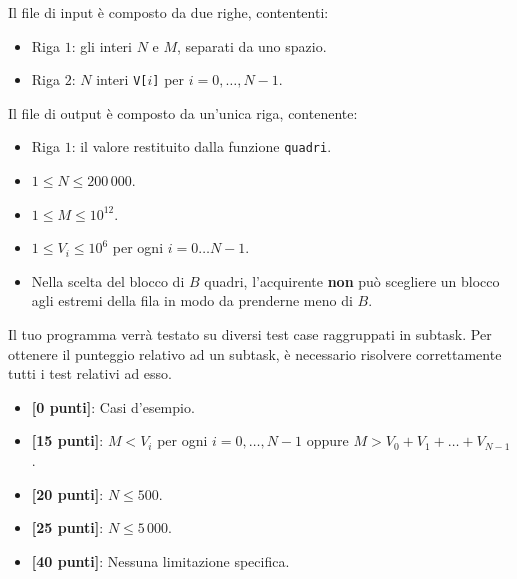 Il file di input è composto da due righe, contententi:

\begin{itemize}[nolistsep,itemsep=2mm]
    \item Riga $1$: gli interi $N$ e $M$, separati da uno spazio.
    \item Riga $2$: $N$ interi \texttt{V[$i$]} per $i = 0,\ldots, N-1$.
\end{itemize}

Il file di output è composto da un'unica riga, contenente:
\begin{itemize}[nolistsep,itemsep=2mm]
    \item Riga $1$: il valore restituito dalla funzione \texttt{quadri}.
\end{itemize}


\Constraints

\begin{itemize}[nolistsep, itemsep=2mm]
\item $1 \le N \le 200\,000$.
\item $1 \le M \le 10^{12}$.
\item $1 \le V_i \le 10^{6}$ per ogni $i = 0 \ldots N-1$.
\item Nella scelta del blocco di $B$ quadri, l'acquirente \textbf{non} può scegliere un blocco agli estremi della fila in modo da prenderne meno di $B$.
\end{itemize}

\Scoring
Il tuo programma verrà testato su diversi test case raggruppati in subtask.
Per ottenere il punteggio relativo ad un subtask, è necessario risolvere
correttamente tutti i test relativi ad esso.
\begin{itemize}[nolistsep,itemsep=2mm]
\item \textbf{ [\phantom{0}0 punti]}: Casi d'esempio.
\item \textbf{ [15 punti]}: $M < V_i$ per ogni $i = 0,\ldots,N-1$ oppure $M > V_0 + V_1 + \ldots + V_{N-1}$.
\item \textbf{ [20 punti]}: $N \le 500$.
\item \textbf{ [25 punti]}: $N \le 5\,000$.
\item \textbf{ [40 punti]}: Nessuna limitazione specifica.
\end{itemize}

